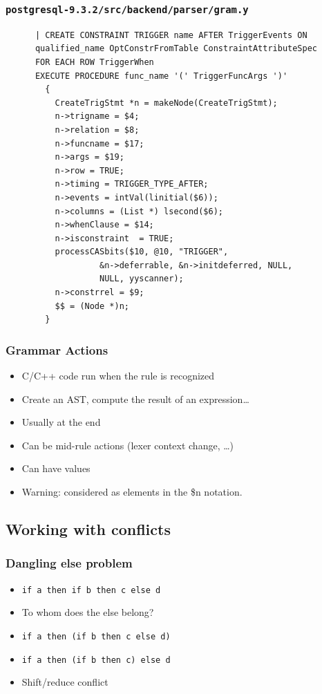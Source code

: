 \documentclass{beamer}
\begin{document}
\begin{frame}[fragile,shrink=25]
  \frametitle{\texttt{postgresql-9.3.2/src/backend/parser/gram.y}}
\begin{verbatim}
      | CREATE CONSTRAINT TRIGGER name AFTER TriggerEvents ON
      qualified_name OptConstrFromTable ConstraintAttributeSpec
      FOR EACH ROW TriggerWhen
      EXECUTE PROCEDURE func_name '(' TriggerFuncArgs ')'
        {
          CreateTrigStmt *n = makeNode(CreateTrigStmt);
          n->trigname = $4;
          n->relation = $8;
          n->funcname = $17;
          n->args = $19;
          n->row = TRUE;
          n->timing = TRIGGER_TYPE_AFTER;
          n->events = intVal(linitial($6));
          n->columns = (List *) lsecond($6);
          n->whenClause = $14;
          n->isconstraint  = TRUE;
          processCASbits($10, @10, "TRIGGER",
                   &n->deferrable, &n->initdeferred, NULL,
                   NULL, yyscanner);
          n->constrrel = $9;
          $$ = (Node *)n;
        }
\end{verbatim}
\end{frame}


\begin{frame}
  \frametitle{Grammar Actions}
    \begin{itemize}
      \item C/C++ code run when the rule is recognized
      \item Create an AST, compute the result of an expression\ldots
      \item Usually at the end
      \item Can be mid-rule actions (lexer context change, \ldots)
      \item Can have values
      \item Warning: considered as elements in the \$n notation.
    \end{itemize}
\end{frame}


\subsection{Working with conflicts}

\begin{frame}
  \frametitle{Dangling else problem}
  \begin{itemize}
      \item \texttt{if a then if b then c else d}
      \item To whom does the else belong?
      \item \texttt{if a then (if b then c else d)}
      \item \texttt{if a then (if b then c) else d}
      \item Shift/reduce conflict
    \end{itemize}
\end{frame}
\end{document}
